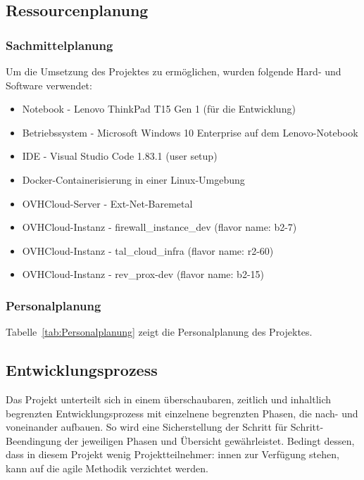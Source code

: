 \subsection{Ressourcenplanung}
\label{sec:Ressourcenplanung}

\subsubsection{Sachmittelplanung}
\label{sec:Sachmittelplanung}
Um die Umsetzung des Projektes zu ermöglichen, wurden folgende Hard- und Software verwendet:
\begin{itemize}
	\item Notebook - Lenovo ThinkPad T15 Gen 1 (für die Entwicklung)
	\item Betriebssystem - Microsoft Windows 10 Enterprise auf dem Lenovo-Notebook
	\item IDE - Visual Studio Code 1.83.1 (user setup)
	\item Docker-Containerisierung in einer Linux-Umgebung
	\item OVHCloud-Server - Ext-Net-Baremetal
	\item OVHCloud-Instanz - firewall\_instance\_dev (flavor name: b2-7)
	\item OVHCloud-Instanz - tal\_cloud\_infra (flavor name: r2-60)
	\item OVHCloud-Instanz - rev\_prox-dev (flavor name: b2-15)
\end{itemize}

\subsubsection{Personalplanung}
\label{sec:Personalplanung}
Tabelle~\ref{tab:Personalplanung} zeigt die Personalplanung des Projektes.

\subsection{Entwicklungsprozess}
\label{sec:Entwicklungsprozess}
Das Projekt unterteilt sich in einem überschaubaren, zeitlich und inhaltlich begrenzten Entwicklungsprozess 
mit einzelnene begrenzten Phasen, die nach- und voneinander aufbauen. So wird eine Sicherstellung der Schritt 
für Schritt-Beendingung der jeweiligen Phasen und Übersicht gewährleistet. Bedingt dessen, dass in diesem Projekt 
wenig Projektteilnehmer: innen zur Verfügung stehen, kann auf die agile Methodik verzichtet werden.
